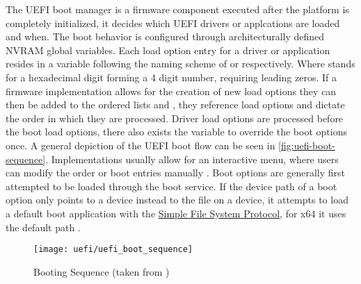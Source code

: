 The \ac{UEFI} boot manager is a firmware component executed after the platform is completely initialized, it decides which \ac{UEFI} drivers or applcations are loaded and when.
The boot behavior is configured through architecturally defined \ac{NVRAM} global variables\cite[Section 3.1]{uefi-spec}.
Each load option entry for a driver or application resides in a variable following the naming scheme of  or  respectively. Where \code{\#} stands for a hexadecimal digit forming a 4 digit number, requiring leading zeros.
If a firmware implementation allows for the creation of new load options they can then be added to the ordered lists  and , they reference load options and dictate the order in which they are processed.
Driver load options are processed before the boot load options, there also exists the  variable to override the boot options once.
A general depiction of the \ac{UEFI} boot flow can be seen in \autoref{fig:uefi-boot-sequence}.
Implementations usually allow for an interactive menu, where users can modify the order or boot entries manually \cite[Section 3.1.1]{uefi-spec}.
Boot options are generally first attempted to be loaded through the  boot service.
If the device path of a boot option only points to a device instead to the file on a device, it attempts to load a default boot application with the \hyperref[lst:simple-file-system-protocol]{Simple File System Protocol}\cite[Section 3.1.2]{uefi-spec}, for x64 it uses the default path  \cite[Section 3.5]{uefi-spec}.

\begin{figure}[htb]%
    \centering%
    \texttt{[image: uefi/uefi\_boot\_sequence]}%
    \caption{Booting Sequence (taken from \cite[Figure 2-1]{uefi-spec})}%
    \label{fig:uefi-boot-sequence}%
\end{figure}
